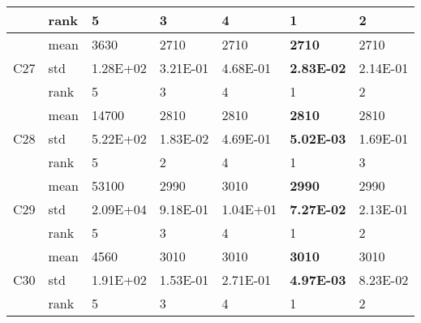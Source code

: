 \begin{table}[]
\begin{tabular}{|l|l|l|l|l|l|l|}
                     & rank & 5        & 3                 & 4                 & 1                 & 2                 \\ \hline
\multirow{3}{*}{C27} & mean & 3630     & 2710              & 2710              & \textbf{2710}     & 2710              \\ \cline{2-7} 
                     & std  & 1.28E+02 & 3.21E-01          & 4.68E-01          & \textbf{2.83E-02} & 2.14E-01          \\ \cline{2-7} 
                     & rank & 5        & 3                 & 4                 & 1                 & 2                 \\ \hline
\multirow{3}{*}{C28} & mean & 14700    & 2810              & 2810              & \textbf{2810}     & 2810              \\ \cline{2-7} 
                     & std  & 5.22E+02 & 1.83E-02          & 4.69E-01          & \textbf{5.02E-03} & 1.69E-01          \\ \cline{2-7} 
                     & rank & 5        & 2                 & 4                 & 1                 & 3                 \\ \hline
\multirow{3}{*}{C29} & mean & 53100    & 2990              & 3010              & \textbf{2990}     & 2990              \\ \cline{2-7} 
                     & std  & 2.09E+04 & 9.18E-01          & 1.04E+01          & \textbf{7.27E-02} & 2.13E-01          \\ \cline{2-7} 
                     & rank & 5        & 3                 & 4                 & 1                 & 2                 \\ \hline
\multirow{3}{*}{C30} & mean & 4560     & 3010              & 3010              & \textbf{3010}     & 3010              \\ \cline{2-7} 
                     & std  & 1.91E+02 & 1.53E-01          & 2.71E-01          & \textbf{4.97E-03} & 8.23E-02          \\ \cline{2-7} 
                     & rank & 5        & 3                 & 4                 & 1                 & 2                 \\ \hline
\end{tabular}
\end{table}